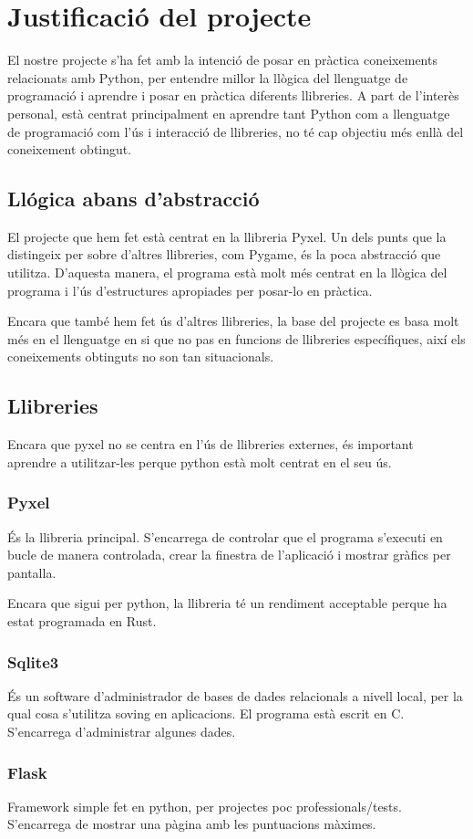 \section{Justificaci\'o del projecte}
El nostre projecte s'ha fet amb la intenci\'o de
posar en pr\`actica coneixements relacionats amb Python,
per entendre millor la ll\`ogica del llenguatge de programaci\'o
i aprendre i posar en pr\`actica diferents llibreries.
A part de l'inter\`es personal,
est\`a centrat principalment en aprendre tant
Python com a llenguatge de programaci\'o com l'\'us i interacci\'o de llibreries,
no t\'e cap objectiu m\'es enll\`a del coneixement obtingut.


\subsection{Ll\'ogica abans d'abstracci\'o}
El projecte que hem fet est\`a centrat en la llibreria Pyxel.
Un dels punts que la distingeix per sobre d'altres llibreries, com Pygame,
\'es la poca abstracci\'o que utilitza.
D'aquesta manera, el programa est\`a molt m\'es centrat en la ll\`ogica
del programa i l'\'us d'estructures apropiades per posar-lo en pr\`actica.

Encara que tamb\'e hem fet \'us d'altres llibreries,
la base del projecte es basa molt m\'es en el llenguatge en si que
no pas en funcions de llibreries espec\'ifiques,
aix\'i els coneixements obtinguts no son tan situacionals.


\subsection{Llibreries}
Encara que pyxel no se centra en l'\'us de llibreries externes,
\'es important aprendre a utilitzar-les
perque python est\`a molt centrat en el seu \'us.

\subsubsection{Pyxel}
\'Es la llibreria principal.
S'encarrega de controlar que el programa s'executi en bucle de manera controlada,
crear la finestra de l'aplicaci\'o i mostrar gr\`afics per pantalla.

Encara que sigui per python, la llibreria t\'e un rendiment acceptable
perque ha estat programada en Rust.

\subsubsection{Sqlite3}
\'Es un software d'administrador de bases de dades relacionals a nivell local,
per la qual cosa s'utilitza soving en aplicacions. El programa est\`a escrit en C.
S'encarrega d'administrar algunes dades.

\subsubsection{Flask}
Framework simple fet en python, per projectes poc professionals/tests.
S'encarrega de mostrar una p\`agina amb les puntuacions m\`aximes.

